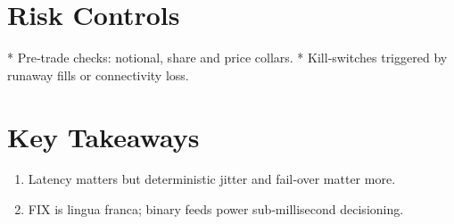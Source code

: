 \section{Risk Controls}

* Pre‑trade checks: notional, share and price collars.  
* Kill‑switches triggered by runaway fills or connectivity loss.

\section*{Key Takeaways}
\begin{enumerate}
  \item Latency matters but deterministic jitter and fail‑over matter more.
  \item FIX is lingua franca; binary feeds power sub‑millisecond decisioning.
\end{enumerate}
